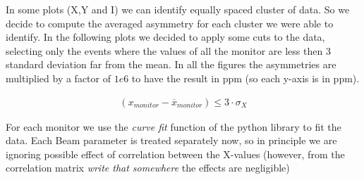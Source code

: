 In some plots (X,Y and I) we can identify equally spaced cluster of data. So we decide to compute the averaged asymmetry for each cluster we were able to identify. 
In the following plots we decided to apply some cuts to the data, selecting only the events where the values of all the monitor are less then 3 standard deviation far from the mean. In all the figures the asymmetries are multiplied by a factor of $1e6$ to have the result in ppm (so each y-axis is in ppm). 

\begin{align*}
(x_{monitor} - \overline{x}_{monitor}) \leq 3 \cdot \sigma_{X}
\end{align*}

For each monitor we use the \textit{curve fit} function of the python library  to fit the data. Each Beam parameter is treated separately now, so in principle we are ignoring possible effect of correlation between the X-values (however, from the correlation matrix    \textit{write that somewhere} the effects are negligible)  

